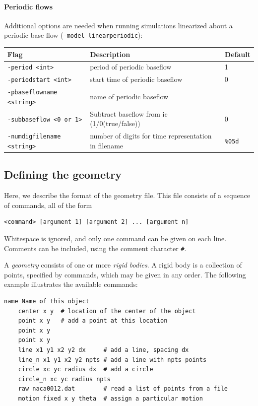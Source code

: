 \documentclass[11pt]{article}
\begin{document}
\paragraph{Periodic flows}
Additional options are needed when running simulations linearized about a periodic base flow (\verb|-model linearperiodic|):

\begin{center}
\begin{tabular}{lll}
Flag & Description & Default\\
\hline
\verb|-period <int>|    & period of periodic baseflow & 1\\
\verb|-periodstart <int>| & start time of periodic baseflow & 0\\
\verb|-pbaseflowname <string>| & name of periodic baseflow\\
\verb|-subbaseflow <0 or 1>| & Subtract baseflow from ic (1/0(true/false)) & 0\\
\verb|-numdigfilename <string>| & number of digits for time representation in filename & {\tt \%05d}
\end{tabular}
\end{center}

\subsection{Defining the geometry}
\label{sub:defining_the_geometry}
Here, we describe the format of the geometry file.  This file consists of a sequence of commands, all of the form
\begin{Verbatim}[gobble=4]
    <command> [argument 1] [argument 2] ... [argument n]
\end{Verbatim}
Whitespace is ignored, and only one command can be given on each line.  Comments can be included, using the comment character {\tt \#}.

A {\em geometry\/} consists of one or more {\em rigid bodies}.  A rigid body is a collection of points, specified by commands, which may be given in any order.  The following example illustrates the available commands:

\begin{Verbatim}[gobble=4]
    name Name of this object
    center x y  # location of the center of the object
    point x y   # add a point at this location
    point x y
    point x y
    line x1 y1 x2 y2 dx     # add a line, spacing dx
    line_n x1 y1 x2 y2 npts # add a line with npts points
    circle xc yc radius dx  # add a circle
    circle_n xc yc radius npts
    raw naca0012.dat        # read a list of points from a file
    motion fixed x y theta  # assign a particular motion
\end{Verbatim}
\end{document}

